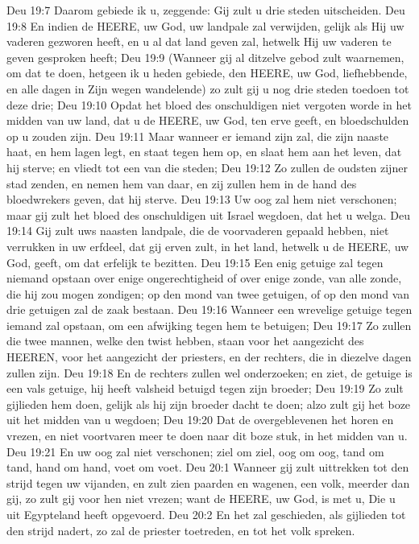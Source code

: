 Deu 19:7  Daarom gebiede ik u, zeggende: Gij zult u drie steden uitscheiden.
Deu 19:8  En indien de HEERE, uw God, uw landpale zal verwijden, gelijk als Hij uw vaderen gezworen heeft, en u al dat land geven zal, hetwelk Hij uw vaderen te geven gesproken heeft;
Deu 19:9  (Wanneer gij al ditzelve gebod zult waarnemen, om dat te doen, hetgeen ik u heden gebiede, den HEERE, uw God, liefhebbende, en alle dagen in Zijn wegen wandelende) zo zult gij u nog drie steden toedoen tot deze drie;
Deu 19:10  Opdat het bloed des onschuldigen niet vergoten worde in het midden van uw land, dat u de HEERE, uw God, ten erve geeft, en bloedschulden op u zouden zijn.
Deu 19:11  Maar wanneer er iemand zijn zal, die zijn naaste haat, en hem lagen legt, en staat tegen hem op, en slaat hem aan het leven, dat hij sterve; en vliedt tot een van die steden;
Deu 19:12  Zo zullen de oudsten zijner stad zenden, en nemen hem van daar, en zij zullen hem in de hand des bloedwrekers geven, dat hij sterve.
Deu 19:13  Uw oog zal hem niet verschonen; maar gij zult het bloed des onschuldigen uit Israel wegdoen, dat het u welga.
Deu 19:14  Gij zult uws naasten landpale, die de voorvaderen gepaald hebben, niet verrukken in uw erfdeel, dat gij erven zult, in het land, hetwelk u de HEERE, uw God, geeft, om dat erfelijk te bezitten.
Deu 19:15  Een enig getuige zal tegen niemand opstaan over enige ongerechtigheid of over enige zonde, van alle zonde, die hij zou mogen zondigen; op den mond van twee getuigen, of op den mond van drie getuigen zal de zaak bestaan.
Deu 19:16  Wanneer een wrevelige getuige tegen iemand zal opstaan, om een afwijking tegen hem te betuigen;
Deu 19:17  Zo zullen die twee mannen, welke den twist hebben, staan voor het aangezicht des HEEREN, voor het aangezicht der priesters, en der rechters, die in diezelve dagen zullen zijn.
Deu 19:18  En de rechters zullen wel onderzoeken; en ziet, de getuige is een vals getuige, hij heeft valsheid betuigd tegen zijn broeder;
Deu 19:19  Zo zult gijlieden hem doen, gelijk als hij zijn broeder dacht te doen; alzo zult gij het boze uit het midden van u wegdoen;
Deu 19:20  Dat de overgeblevenen het horen en vrezen, en niet voortvaren meer te doen naar dit boze stuk, in het midden van u.
Deu 19:21  En uw oog zal niet verschonen; ziel om ziel, oog om oog, tand om tand, hand om hand, voet om voet.
Deu 20:1  Wanneer gij zult uittrekken tot den strijd tegen uw vijanden, en zult zien paarden en wagenen, een volk, meerder dan gij, zo zult gij voor hen niet vrezen; want de HEERE, uw God, is met u, Die u uit Egypteland heeft opgevoerd.
Deu 20:2  En het zal geschieden, als gijlieden tot den strijd nadert, zo zal de priester toetreden, en tot het volk spreken.
